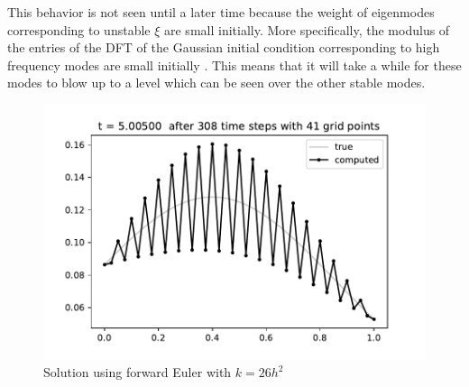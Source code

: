 \documentclass[10pt]{article}
\begin{document}
\begin{solution}[Solution]
\begin{enumerate}[label=(\alph*)]
    This behavior is not seen until a later time because the weight of eigenmodes corresponding to unstable \( \xi \) are small initially. More specifically, the modulus of the entries of the DFT of the Gaussian initial condition corresponding to high frequency modes are small initially . This means that it will take a while for these modes to blow up to a level which can be seen over the other stable modes.


    \begin{figure}[H]\centering
        \includegraphics[width=.5\textwidth]{img/fwe_unstable.pdf}
        \caption{Solution using forward Euler with \( k=26h^2 \)}
    \label{unstable}
    \end{figure}

    
    


\end{enumerate}
\end{solution}
\end{document}
